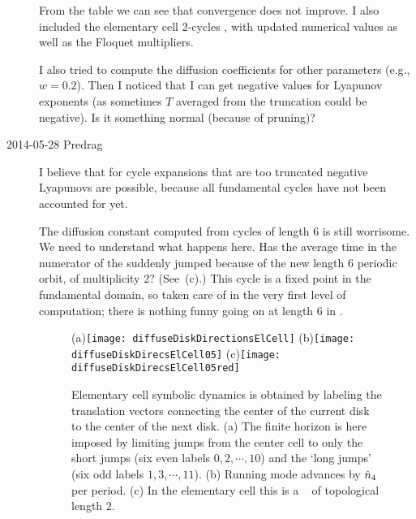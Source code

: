 \begin{description}
From the table  we can see that convergence does not
improve. I also included the elementary cell 2-cycles
, with updated numerical values as well as
the Floquet multipliers.

I also tried to compute the diffusion coefficients for other parameters
(e.g., $w=0.2$). Then I noticed that I can get negative values for
Lyapunov exponents (as sometimes $T$ averaged from the truncation could
be negative). Is it something normal (because of pruning)?

\item[2014-05-28 Predrag]
I believe that for cycle expansions that are too truncated negative
Lyapunovs are possible, because all  fundamental cycles have not been
accounted for yet.

The diffusion constant computed from cycles of length 6 is still
worrisome. We need to understand what happens here. Has the average time
in the numerator of the {\cycForm}  suddenly jumped
because of the new length 6 periodic orbit, of multiplicity 2?
(See \,(c).)
This cycle is a fixed point in the fundamental domain, so taken care of
in the very first level of computation; there is nothing funny going on
at length 6 in .



\begin{figure}
\begin{center}
(a)\texttt{[image: diffuseDiskDirectionsElCell]}
(b)\texttt{[image: diffuseDiskDirecsElCell05]}
(c)\texttt{[image: diffuseDiskDirecsElCell05red]}
\end{center}
\caption{
Elementary cell symbolic dynamics is obtained by labeling the translation
vectors connecting the center of the current disk to the center of the
next disk.
(a) The finite horizon is here imposed by limiting jumps from the
center cell to only the short jumps (six even labels $0, 2,\cdots,10$)
and the `long jumps' (six odd labels $1, 3,\cdots,11$).
(b) Running mode  advances by $\hat{n}_4$ per period.
(c) In the elementary cell this is a \po\ 
    of topological length 2.
    }
\label{diskDirectionsElCell}
\end{figure}


\end{description}
